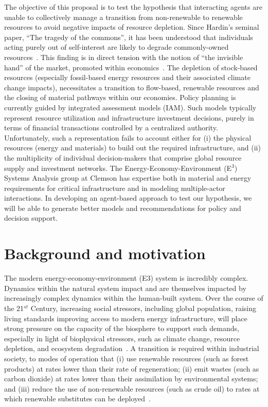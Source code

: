 \documentclass[11pt,a4paper]{article}
\begin{document}
The objective of this proposal is to test the hypothesis that 
interacting agents are unable to collectively manage 
a transition from non-renewable to renewable resources 
to avoid negative impacts of resource depletion. 
Since Hardin's seminal paper, ``The tragedy of the commons'',
it has been understood that individuals acting purely out of self-interest
are likely to degrade commonly-owned resources~\cite{Hardin1968}.
This finding is in direct tension with the notion of
``the invisible hand'' of the market,
promoted within economics~\cite{Smith1776}.
The depletion of stock-based resources
(especially fossil-based energy resources
and their associated climate change impacts),
necessitates a transition to flow-based, renewable resources
and the closing of material pathways within our economies.
Policy planning is currently guided by integrated assessment models (IAM).
Such models typically represent resource utilization and infrastructure investment decisions,
purely in terms of financial transactions controlled by a centralized authority.
Unfortunately, such a representation fails to account either for
(i) the physical resources (energy and materials) 
to build out the required infrastructure, and
(ii) the multiplicity of individual decision-makers that comprise 
global resource supply and investment networks.
The Energy-Economy-Environment (E$^3$) Systems Analysis group
at Clemson has expertise both in 
material and energy requirements for critical infrastructure 
and in modeling multiple-actor interactions.
In developing an agent-based approach to test our hypothesis,
we will be able to generate better models and recommendations 
for policy and decision support.



\section{Background and motivation}
\label{sec:back}

The modern energy-economy-environment (E3) system is incredibly complex.
Dynamics within the natural system impact and are themselves impacted by
increasingly complex dynamics within the human-built system.
Over the course of the 21$^{st}$ Century, 
increasing social stressors, including
global population,
raising living standards
improving access to modern energy infrastructure,
will place strong pressure on the capacity of the biosphere
to support such demands,
especially in light of biophysical stressors,
such as climate change,
resource depletion, and
ecosystem degradation~\cite{IPCC2014}.
A transition is required within industrial society,
to modes of operation that
(i) use renewable resources (such as forest products) 
at rates lower than their rate of regeneration;
(ii) emit wastes (such as carbon dioxide) 
at rates lower than their assimilation by environmental systems; and
(iii) reduce the use of non-renewable resources (such as crude oil) 
to rates at which renewable substitutes can be deployed~\cite{Goodland1996, G-R1971}.
\end{document}
